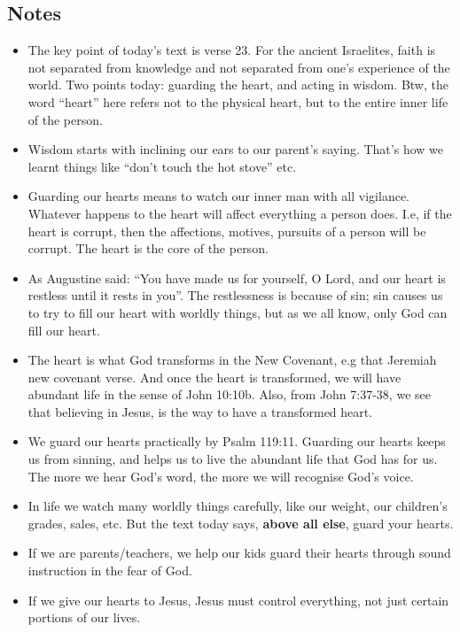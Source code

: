 \subsection*{Notes}
\begin{itemize}
  \item{The key point of today's text is verse 23.  For the ancient
  Israelites, faith is not separated from knowledge and not separated from
  one's experience of the world.  Two points today: guarding the heart, and
  acting in wisdom.  Btw, the word ``heart'' here refers not to the physical
  heart, but to the entire inner life of the person.}
  \item{Wisdom starts with inclining our ears to our parent's saying.  That's
  how we learnt things like ``don't touch the hot stove'' etc.}
  \item{Guarding our hearts means to watch our inner man with all vigilance.
  Whatever happens to the heart will affect everything a person does.  I.e,
  if the heart is corrupt, then the affections, motives, pursuits of a person
  will be corrupt. The heart is the core of the person.}
  \item{As Augustine said: ``You have made us for yourself, O Lord, and our
  heart is restless until it rests in you''.  The restlessness is because of
  sin; sin causes us to try to fill our heart with worldly things, but as we
  all know, only God can fill our heart.}
  \item{The heart is what God transforms in the New Covenant, e.g that
  Jeremiah new covenant verse.  And once the heart is transformed, we will
  have abundant life in the sense of John 10:10b.  Also, from John 7:37-38,
  we see that believing in Jesus, is the way to have a transformed heart.}
  \item{We guard our hearts practically by Psalm 119:11.  Guarding our
  hearts keeps us from sinning, and helps us to live the abundant life that
  God has for us.  The more we hear God's word, the more we will recognise
  God's voice.}
  \item{In life we watch many worldly things carefully, like our weight, our
  children's grades, sales, etc.  But the text today says, \textbf{above all
  else}, guard your hearts.}
  \item{If we are parents/teachers, we help our kids guard their hearts
  through sound instruction in the fear of God.}
  \item{If we give our hearts to Jesus, Jesus must control everything, not
  just certain portions of our lives.}

\end{itemize}
